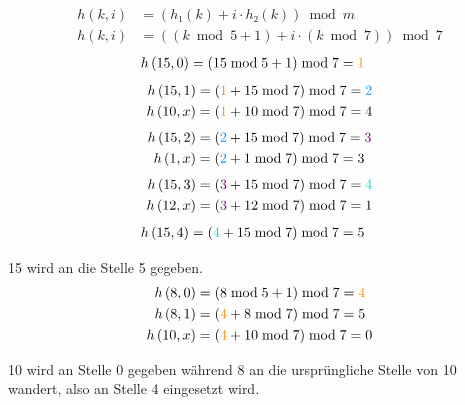 \documentclass[a4paper, 12pt]{article}
\begin{document}
\begin{align*}
	h\left(k, i\right) &
		= \left( h₁\left(k\right) + i ⋅ h₂\left(k\right) \right) \bmod{m}
	\\
	h\left(k, i \right) &
		= \left(
			\left( k \bmod{5} + 1 \right) + i ⋅ \left(k \bmod{7} \right)
		\right) \bmod{7}
\end{align*}
\begin{align*}
	h\left(15, 0 \right) &
		= \left( 15 \bmod{5} +1 \right) \bmod{7} = \textcolor{orange}{1}
\end{align*}
\begin{align*}
	h\left(15, 1 \right) &
		= \left( \textcolor{orange}{1} + 15 \bmod{7} \right) \bmod{7}
		= \textcolor{aqua}{2}
	\\
	h\left(10, x \right) &
		= \left( \textcolor{orange}{1} + 10 \bmod{7} \right) \bmod{7}
		= 4
\end{align*}
\begin{align*}
	h\left(15, 2 \right) &
		= \left( \textcolor{aqua}{2} + 15 \bmod{7} \right) \bmod{7}
		= \textcolor{violet}{3}
	\\
	h\left(1, x \right) &
		= \left( \textcolor{aqua}{2} + 1 \bmod{7} \right) \bmod{7}
		= 3
\end{align*}
\begin{align*}
	h\left(15, 3 \right) &
		= \left( \textcolor{violet}{3} + 15 \bmod{7} \right) \bmod{7}
		= \textcolor{turquoise}{4}
	\\
	h\left(12, x \right) &
		= \left( \textcolor{violet}{3} + 12 \bmod{7} \right) \bmod{7}
		= 1
\end{align*}
\begin{align*}
	h\left(15, 4 \right) &
		= \left( \textcolor{turquoise}{4} + 15 \bmod{7} \right) \bmod{7}
		= 5
\end{align*}

15 wird an die Stelle 5 gegeben.
\begin{align*}
	h\left(8, 0 \right) &
		= \left( 8 \bmod{5} + 1 \right) \bmod{7}
		= \textcolor{orange}{4}
	\\
	h\left(8, 1 \right) &
		= \left( \textcolor{orange}{4} + 8 \bmod{7} \right) \bmod{7}
		= 5
	\\
	h\left(10, x \right) &
		= \left( \textcolor{orange}{4} + 10 \bmod{7} \right) \bmod{7}
		= 0
\end{align*}

10 wird an Stelle 0 gegeben während 8 an die ursprüngliche Stelle von 10
wandert, also an Stelle 4 eingesetzt wird.\\
\end{document}
